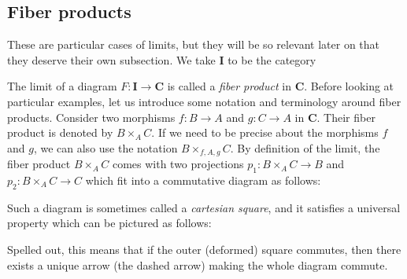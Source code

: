 \documentclass[12pt,reqno,a4paper]{amsart}
\theoremstyle{plain}
\theoremstyle{definition}
\theoremstyle{remark}
\begin{document}
\subsection{Fiber products}

These are particular cases of limits, but they will be so relevant later on that they deserve their own subsection.
We take $\mathbf{I}$ to be the category
\begin{center}
\end{center}

The limit of a diagram $F \colon \mathbf{I} \to \mathbf{C}$ is called a \textit{fiber product} in $\mathbf{C}$.
Before looking at particular examples, let us introduce some notation and terminology around fiber products.
Consider two morphisms $f \colon B \to A$ and $g \colon C \to A$ in $\mathbf{C}$.
Their fiber product is denoted by $B \times_{A} C$.
If we need to be precise about the morphisms $f$ and $g$, we can also use the notation $B \times_{f,A,g} C$.
By definition of the limit, the fiber product $B \times_{A} C$ comes with two projections $p_{1} \colon B \times_{A} C \to B$ and $p_{2} \colon B \times_{A} C \to C$ which fit into a commutative diagram as follows:
\begin{center}
\end{center}
Such a diagram is sometimes called a \textit{cartesian square}, and it satisfies a universal property which can be pictured as follows:
\begin{center}
\end{center}
Spelled out, this means that if the outer (deformed) square commutes, then there exists a unique arrow (the dashed arrow) making the whole diagram commute.
\end{document}
